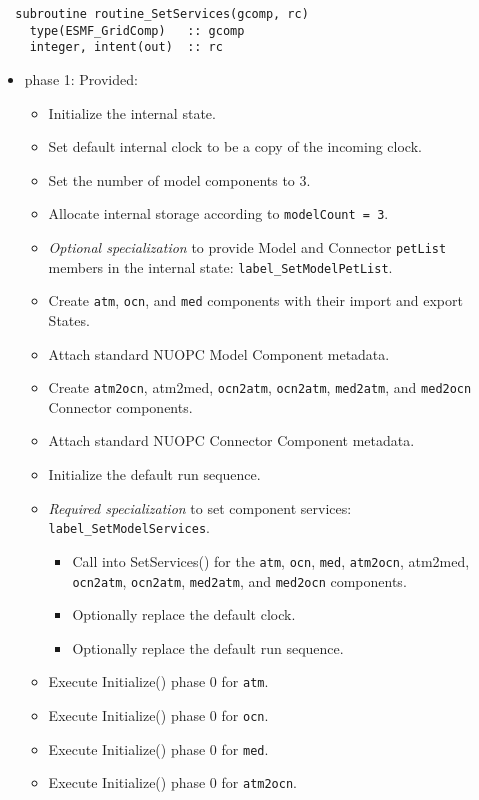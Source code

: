 \begin{verbatim}  subroutine routine_SetServices(gcomp, rc)
    type(ESMF_GridComp)   :: gcomp
    integer, intent(out)  :: rc
\end{verbatim}

\begin{itemize}
\item phase 1: {\sc Provided:}
  \begin{itemize}
  \item Initialize the internal state.
  \item Set default internal clock to be a copy of the incoming clock.
  \item Set the number of model components to 3.
  \item Allocate internal storage according to {\tt modelCount = 3}.
  \item {\it Optional specialization} to provide Model and Connector {\tt petList} members in the internal state: {\tt label\_SetModelPetList}.
  \item Create {\tt atm}, {\tt ocn}, and {\tt med} components with their import and export States.
  \item Attach standard NUOPC Model Component metadata.
  \item Create {\tt atm2ocn}, {atm2med}, {\tt ocn2atm}, {\tt ocn2atm}, {\tt med2atm}, and {\tt med2ocn} Connector components.
  \item Attach standard NUOPC Connector Component metadata.
  \item Initialize the default run sequence.
  \item {\it Required specialization} to set component services: {\tt label\_SetModelServices}. 
  \begin{itemize}
    \item Call into SetServices() for the {\tt atm}, {\tt ocn}, {\tt med}, {\tt atm2ocn}, {atm2med}, {\tt ocn2atm}, {\tt ocn2atm}, {\tt med2atm}, and {\tt med2ocn} components.
    \item Optionally replace the default clock. 
    \item Optionally replace the default run sequence.
  \end{itemize}
  \item Execute Initialize() phase 0 for {\tt atm}.
  \item Execute Initialize() phase 0 for {\tt ocn}.
  \item Execute Initialize() phase 0 for {\tt med}.
  \item Execute Initialize() phase 0 for {\tt atm2ocn}.

\end{itemize}
\end{itemize}
